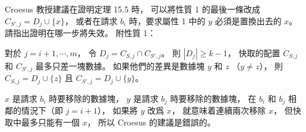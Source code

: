 \startEXERCISE
Croesus 教授建議在證明定理 15.5 時，
可以將性質 1 的最後一條改成 $C_{S',j}=D_j\cup \{x\}$，
或者在請求 $b_i$ 時，要求屬性 1 中的 $y$ 必須是置換出去的 $x$。
請指出證明在哪一步將失效。
附性質 1：

對於 $j=i+1,\cdots,m$，
令 $D_j = C_{S,j}\cap C_{S',j}$。
則 $|D_j|\ge k-1$，
快取的配置 $C_{S,j}$ 和 $C_{S',j}$ 最多只差一塊數據。
如果他們的差異是數據塊 $y$ 和 $z$ （$y\ne z$），
則 $C_{S,j}=D_j\cup \{z\}$
 且 $C_{S',j}=D_j\cup\{y\}$。
\stopEXERCISE

\startANSWER
$x$ 是請求 $b_i$ 時要移除的數據塊，
 $y$ 是請求 $b_j$ 時要移除的數據塊，
在 $b_i$ 和 $b_j$ 相鄰的情況下（即 $j=i+1$），
如果將 $y$ 改爲 $x$，
就意味着連續兩次移除 $x$，
但快取中最多只能有一個 $x$，
所以 Croesus 的建議是錯誤的。
\stopANSWER

